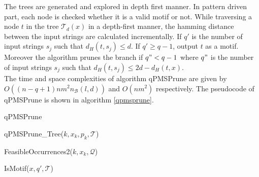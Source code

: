 The trees are generated and explored in depth first manner. In pattern driven part, each node is checked whether it is a valid motif or not. While traversing a node $t$ in the tree $\mathcal{T}_{d}(x)$ in a depth-first manner, the hamming distance between the input strings are calculated incrementally. If $q'$ is the number of input strings $s_j$ such that $d_{H}(t,s_j)\leq d$. If $q'\geq q-1$, output $t$ as a motif. Moreover the algorithm prunes the branch if $q" < q-1$ where $q"$ is the number of input strings $s_j$ such that $d_H(t,s_j) \leq 2d-d_{H}(t,x)$.\\

The time and space complexities of algorithm qPMSPrune are given by $O((n-q+1)nm^{2}n_{\mathcal{B}}(l,d))$ and $O(nm^2)$  respectively. The pseudocode of qPMSPrune is shown in algorithm \cref{qpmsprune}.

\begin{algorithm}[H]
	\caption{qPMSPrune}
	\label{qpmsprune}
	\begin{algorithmic}[1]
		
	\end{algorithmic}
\end{algorithm}

\begin{algorithm}[H]
	\caption{qPMSPrune\_Tree($k,x_{k},p_{k},\mathcal{T}$)}
	\label{qpmsprune_tree}
	\begin{algorithmic}[1]
		
	\end{algorithmic}
\end{algorithm}

\begin{algorithm}[H]
	\caption{FeasibleOccurrences2($k,x_{k},\mathcal{Q}$)}
	\label{feasibleoccurrences2}
	\begin{algorithmic}[1]
		
	\end{algorithmic}
\end{algorithm}

\begin{algorithm}[H]
	\caption{IsMotif($x,q',\mathcal{T}$)}
	\label{ismotif}
	\begin{algorithmic}[1]
		
	\end{algorithmic}
\end{algorithm}



